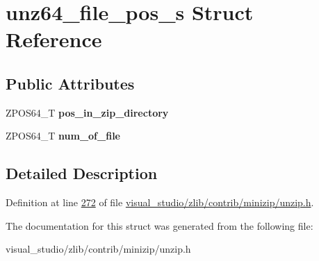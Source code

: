 \hypertarget{structunz64__file__pos__s}{}\section{unz64\+\_\+file\+\_\+pos\+\_\+s Struct Reference}
\label{structunz64__file__pos__s}
\subsection*{Public Attributes}
\begin{DoxyCompactItemize}
\item 
\mbox{\label{structunz64__file__pos__s_a56b202151059b18903fe46dacbfbf12d}} 
Z\+P\+O\+S64\+\_\+T {\bfseries pos\+\_\+in\+\_\+zip\+\_\+directory}
\item 
\mbox{\label{structunz64__file__pos__s_a3750057b6e72229a7acfb12b23bcb2fb}} 
Z\+P\+O\+S64\+\_\+T {\bfseries num\+\_\+of\+\_\+file}
\end{DoxyCompactItemize}


\subsection{Detailed Description}


Definition at line \hyperlink{visual__studio_2zlib_2contrib_2minizip_2unzip_8h_source_l00272}{272} of file \hyperlink{visual__studio_2zlib_2contrib_2minizip_2unzip_8h_source}{visual\+\_\+studio/zlib/contrib/minizip/unzip.\+h}.



The documentation for this struct was generated from the following file\+:\begin{DoxyCompactItemize}
\item 
visual\+\_\+studio/zlib/contrib/minizip/unzip.\+h\end{DoxyCompactItemize}
